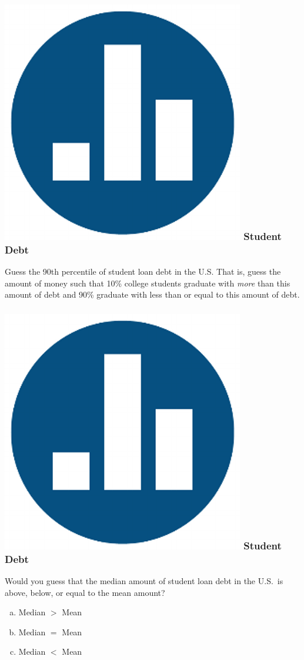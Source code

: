 \documentclass[handout]{beamer}
\begin{document}

\begin{frame}
\frametitle{\includegraphics[scale = 0.05]{./images/clicker} \hfill  Student Debt}
Guess the \alert{90th percentile} of student loan debt in the U.S. That is, guess the amount of money such that 10\% college students graduate with \emph{more} than this amount of debt and 90\% graduate with less than or equal to this amount of debt.

\end{frame}
\begin{frame}
\frametitle{\includegraphics[scale = 0.05]{./images/clicker} \hfill  Student Debt}

Would you guess that the median amount of student loan debt in the U.S.\ is above, below,  or equal to the mean amount?
\begin{enumerate}[(a)]
	\item Median $>$ Mean
	\item Median $=$ Mean
	\item Median $<$ Mean
\end{enumerate}

\end{frame}
\end{document}

